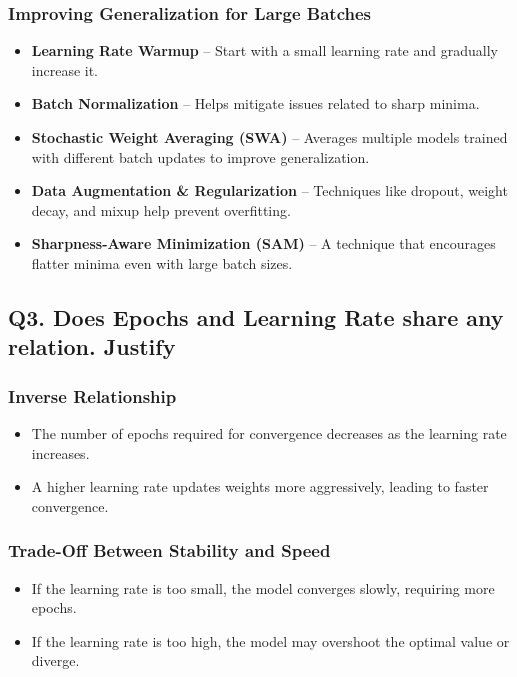 \documentclass{article}
\begin{document}
\subsubsection{Improving Generalization for Large Batches}
\begin{itemize}
    \item \textbf{Learning Rate Warmup} – Start with a small learning rate and gradually increase it.
    \item \textbf{Batch Normalization} – Helps mitigate issues related to sharp minima.
    \item \textbf{Stochastic Weight Averaging (SWA)} – Averages multiple models trained with different batch updates to improve generalization.
    \item \textbf{Data Augmentation \& Regularization} – Techniques like dropout, weight decay, and mixup help prevent overfitting.
    \item \textbf{Sharpness-Aware Minimization (SAM)} – A technique that encourages flatter minima even with large batch sizes.
\end{itemize}


\subsection{Q3. Does Epochs and Learning Rate share any relation. Justify}

\subsubsection{Inverse Relationship}
\begin{itemize}
    \item The number of epochs required for convergence decreases as the learning rate increases.
    \item A higher learning rate updates weights more aggressively, leading to faster convergence.
\end{itemize}

\subsubsection{Trade-Off Between Stability and Speed}
\begin{itemize}
    \item If the learning rate is too small, the model converges slowly, requiring more epochs.
    \item If the learning rate is too high, the model may overshoot the optimal value or diverge.
\end{itemize}
\end{document}
